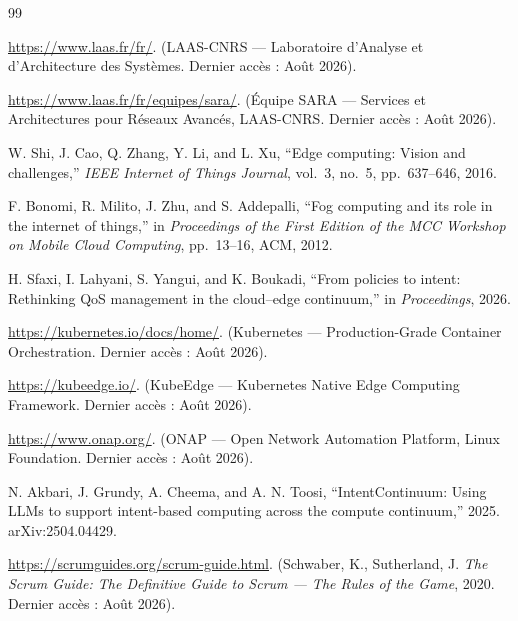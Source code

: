 \cleardoublepage
{}

\begin{thebibliography}{99}

\url{https://www.laas.fr/fr/}. (LAAS-CNRS --- Laboratoire d'Analyse et
d'Architecture des Systèmes. Dernier accès : Août 2026).

\url{https://www.laas.fr/fr/equipes/sara/}. (Équipe SARA --- Services et
Architectures pour Réseaux Avancés, LAAS-CNRS. Dernier accès : Août 2026).

W. Shi, J. Cao, Q. Zhang, Y. Li, and L. Xu, ``Edge computing: Vision and
challenges,'' \textit{IEEE Internet of Things Journal}, vol.~3, no.~5,
pp.~637--646, 2016.

F. Bonomi, R. Milito, J. Zhu, and S. Addepalli, ``Fog computing and its role in
the internet of things,'' in \textit{Proceedings of the First Edition of the MCC
Workshop on Mobile Cloud Computing}, pp.~13--16, ACM, 2012.

H. Sfaxi, I. Lahyani, S. Yangui, and K. Boukadi, ``From policies to intent:
Rethinking QoS management in the cloud--edge continuum,'' in
\textit{Proceedings}, 2026.

\url{https://kubernetes.io/docs/home/}. (Kubernetes --- Production-Grade
Container Orchestration. Dernier accès : Août 2026).

\url{https://kubeedge.io/}. (KubeEdge --- Kubernetes Native Edge Computing
Framework. Dernier accès : Août 2026).

\url{https://www.onap.org/}. (ONAP --- Open Network Automation Platform, Linux
Foundation. Dernier accès : Août 2026).

N. Akbari, J. Grundy, A. Cheema, and A. N. Toosi, ``IntentContinuum: Using LLMs
to support intent-based computing across the compute continuum,'' 2025.
arXiv:2504.04429.

\url{https://scrumguides.org/scrum-guide.html}. (Schwaber, K., Sutherland, J.
\textit{The Scrum Guide: The Definitive Guide to Scrum --- The Rules of the
Game}, 2020. Dernier accès : Août 2026).


\end{thebibliography}
